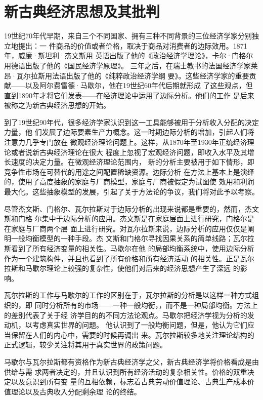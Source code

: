 \part{新古典经济思想及其批判}

19世纪70年代早期，来自三个不同国家、拥有三种不同背景的三位经济学家分别独立地提出：一
件商品的价值或者价格，取决于商品对消费者的边际效用。1871年，威廉·斯坦利·杰文斯用
英语出版了他的《政治经济学理论》，卡尔·门格尔用德语出版了他的《国民经济学原理》。
三年之后，在瑞士教书的法国经济学家莱昂·瓦尔拉斯用法语出版了他的《纯粹政治经济学纲
要》。这些经济学家的重要贡献——以及阿尔费雷德·马歇尔，他在19世纪60年代后期就形成
了这些观点，但直到1890年才将它们发表——在经济理论中运用了边际分析。他们的工作
是后来被称之为新古典经济思想的开始。

到了19世纪90年代，很多经济学家认识到这一工具能够被用于分析收入分配的决定力量，他
们发展了边际要素生产力概念。这一时期边际分析的增加，引起人们将注意力几乎专门放在
微观经济理论问题上。这样，从1870年至1930年正统经济理论或者说新古典经济理论在很大
程度上忽视了宏观经济问题，即收入水平及其增长速度的决定力量。在微观经济理论范围内，
新的分析主要被用于如下情形，即竞争性市场在可替代的用途之间配置稀缺资源。边际分析
在方法上基本上是演绎的，使用了高度抽象的家庭与厂商模型，家庭与厂商被假定为试图使
效用和利润最大化。这些抽象模型的发展，引起了关于方法论的争议，我们将对此予以考察。

尽管杰文斯、门格尔、瓦尔拉斯对于边际分析的出现来说都是重要的，然而，杰文斯和门格
尔集中于边际分析的应用。杰文斯是在家庭层面上进行研究，门格尔是在家庭与厂商两个层
面上进行研究。对瓦尔拉斯来说，边际分析的应用仅仅是阐明一般均衡模型的一种手段。杰
文斯和门格尔寻找因果关系的简单线路；瓦尔拉斯看到了所有经济变量的相关性。马歇尔在他
的局部均衡系统中，使用边际分析作为一个建筑构件，并且也看到了所有价格和所有经济活动
的相关性。正是瓦尔拉斯和马歇尔理论上较强的复杂性，使他们对后来的经济思想产生了深远
的影响。

瓦尔拉斯的工作与马歇尔的工作的区别在于，瓦尔拉斯的分析是以这样一种方式组织的，即
同时分析所有的市场——一种一般均衡，，而不是一种局部均衡。方法上的差别代表了关于经
济学目的的不同方法论观点。马歇尔把经济学视为分析的发动机，以考虑真实世界的问题。
他认识到了一般均衡问题，但是，他认为它们应当保留在人们的内心中，需要的时候再调出
来。瓦尔拉斯较多地关注理论结构的正式逻辑，较少关注将其用于真实世界的政策问题。

马歇尔与瓦尔拉斯都有资格作为新古典经济学之父，新古典经济学将价格看成是由供给与需
求两者决定的，并且认识到所有经济活动的复杂相关性。价格的双重决定以及意识到所有变
量的互相依赖，标志着古典劳动价值理论、古典生产成本价值理论以及古典收入分配剩余理
论的终结。

